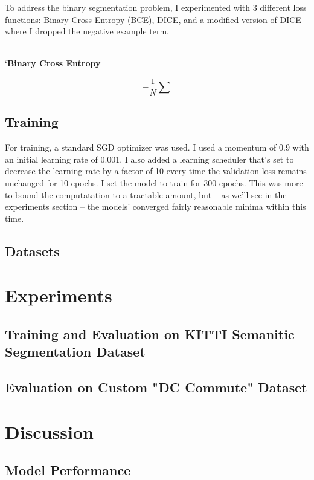 \documentclass[Location Location Location! : Exploring Image Segmentation Problem In Urban Driving Scenarios]{IEEEtran}
\begin{document}
To address the binary segmentation problem, I experimented with 3 different loss functions: Binary Cross Entropy (BCE), DICE, and a modified version of DICE where I dropped the negative example term.

\\
`\textbf{Binary Cross Entropy}

\begin{equation}
-\frac{1}{N} \sum
\end{equation}

\subsection{Training}

For training, a standard SGD optimizer was used. I used a momentum of 0.9 with an initial learning rate of 0.001. I also added a learning scheduler that's set to decrease the learning rate by a factor of 10 every time the validation loss remains unchanged for 10 epochs. I set the model to train for 300 epochs. This was more to bound the computatation to a tractable amount, but -- as we'll see in the experiments section -- the models' converged fairly reasonable minima within this time. 


\subsection{Datasets}



\section{Experiments}

\subsection{Training and Evaluation on KITTI Semanitic Segmentation Dataset}

\subsection{Evaluation on Custom "DC Commute" Dataset}



\section{Discussion}

\subsection{Model Performance }
\end{document}
